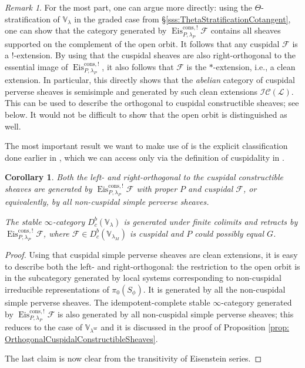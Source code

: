 \documentclass{amsart}
\newtheorem{corollary}[theorem]{Corollary}
\theoremstyle{definition}
\theoremstyle{remark}
\newtheorem{remark}[theorem]{Remark}
\numberwithin{equation}{section}
\newcommand{\mc}{\mathcal}
\DeclareMathOperator{\Eis}{\mathrm{Eis}}
\newcommand{\ur}{\mathrm{ur}}
\newcommand{\V}{\mathbb{V}}
\begin{document}
\begin{remark}
For the most part, one can argue more directly: using the $\Theta$-stratification of $\V_\lambda$ in the graded case from \S \ref{sss:ThetaStratificationCotangent}, one can show that the category generated by $\Eis_{P, \lambda_P}^{\mathrm{cons}, !}\mc F$ contains all sheaves supported on the complement of the open orbit. It follows that any cuspidal $\mc F$ is a $!$-extension. By using that the cuspidal sheaves are also right-orthogonal to the essential image of $\Eis_{P, \lambda_P}^{\mathrm{cons}, !}$, it also follows that $\mc F$ is the $*$-extension, i.e., a clean extension. In particular, this directly shows that the \emph{abelian} category of cuspidal perverse sheaves is semisimple and generated by such clean extensions $\mc{IC} (\mc L)$. This can be used to describe the orthogonal to cuspidal constructible sheaves; see below. It would not be difficult to show that the open orbit is distinguished as well.  

The most important result we want to make use of is the explicit classification done earlier in \cite{LusztigIntersection}, which we can access only via the definition of cuspidality in \cite{LusztigGraded}. 
\end{remark}

\begin{corollary}\label{cor: ConstructibleCuspidalComplement}
Both the left- and right-orthogonal to the cuspidal constructible sheaves are generated by $\Eis_{P, \lambda_P}^{\mathrm{cons},!}\mc F$ with proper $P$ and cuspidal $\mc F$, or equivalently, by all non-cuspidal simple perverse sheaves.  

The stable $\infty$-category $D^b_c (\V_{\lambda})$ is generated under finite colimits and retracts by $\Eis_{P, \lambda_P}^{\mathrm{cons}, !}\mc F$, where $\mc F\in D^b_c(\V_{\lambda_M})$ is cuspidal and $P$ could possibly equal $G$. 
\end{corollary}

\begin{proof}
Using that cuspidal simple perverse sheaves are clean extensions, it is easy to describe both the left- and right-orthogonal: the restriction to the open orbit is in the subcategory generated by local systems corresponding to non-cuspidal irreducible representations of $\pi_0(S_\phi)$. It is generated by all the non-cuspidal simple perverse sheaves. The idempotent-complete stable $\infty$-category generated by $\Eis_{P, \lambda_P}^{\mathrm{cons},!}\mc F$ is also generated by all non-cuspidal simple perverse sheaves; this reduces to the case of $\V_{\lambda^\ur}$ and it is discussed in the proof of Proposition \ref{prop: OrthogonalCuspidalConstructibleSheaves}.

The last claim is now clear from the transitivity of Eisenstein series. 
\end{proof}
\end{document}
